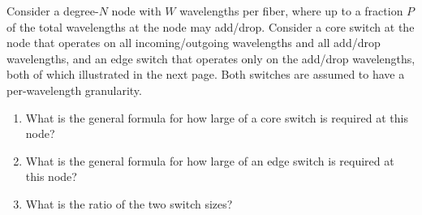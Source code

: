 \documentclass[10pt,letterpaper]{article}
\begin{document}
Consider a degree-$N$ node with $W$ wavelengths per fiber, where up to a fraction $P$ of the total wavelengths at the node may add/drop. Consider a core switch at the node that operates on all incoming/outgoing wavelengths and all add/drop wavelengths, and an edge switch that operates only on the add/drop wavelengths, both of which illustrated in the next page. Both switches are assumed to have a per-wavelength granularity.
\begin{enumerate}[label=\alph*)]
\item
What is the general formula for how large of a core switch is required at this node?
\item
What is the general formula for how large of an edge switch is required at this node?
\item
What is the ratio of the two switch sizes?
\end{enumerate}
\end{document}
